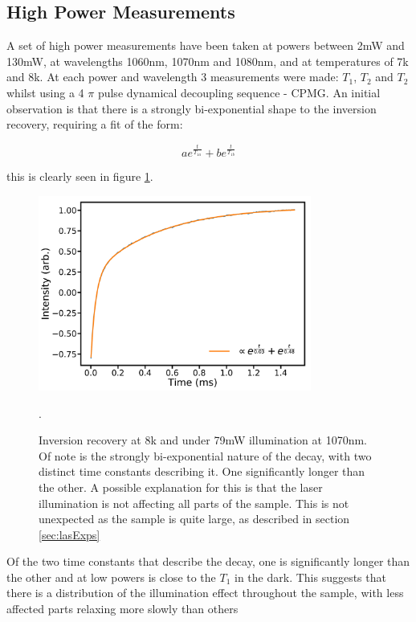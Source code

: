 \subsection{High Power Measurements}

A set of high power measurements have been taken at powers between 2mW and 130mW, at wavelengths 1060nm, 1070nm and 1080nm, and at temperatures of 7k and 8k.
At each power and wavelength 3 measurements were made: $T_1$, $T_2$ and $T_2$ whilst using a 4 $\pi$ pulse dynamical decoupling sequence - CPMG.
An initial observation is that there is a strongly bi-exponential shape to the inversion recovery, requiring a fit of the form:

\begin{equation}
a e^{\frac{t}{T_{1a}}} + b e^{\frac{t}{T_{1b}}}
\end{equation}

this is clearly seen in figure \ref{fig:biexpDec}.

\begin{figure}
\centering
\includegraphics[width=0.8\textwidth]{Figures/T1_biExp.pdf}
\caption[Inversion recovery under laser illumination]{Inversion recovery at 8k and under 79mW illumination at 1070nm. Of note is the strongly bi-exponential nature of the decay, with two distinct time constants describing it. One significantly longer than the other. A possible explanation for this is that the laser illumination is not affecting all parts of the sample. This is not unexpected as the sample is quite large, as described in section \ref{sec:lasExps}}. 
\label{fig:biexpDec}
\end{figure}

Of the two time constants that describe the decay, one is significantly longer than the other and at low powers is close to the $T_1$ in the dark.
This suggests that there is a distribution of the illumination effect throughout the sample, with less affected parts relaxing more slowly than others 